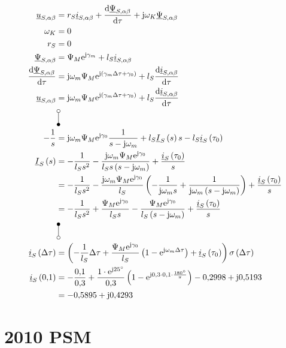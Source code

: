 \documentclass[11pt,a4paper]{scrartcl}
\newcommand{\mybr}[1]{\left(#1\right)}
\renewcommand{\j}{\mathrm{j}}
\renewcommand{\u}{\underline{u}}
\newcommand{\I}{\underline{I}}
\renewcommand{\i}{\underline{i}}
\newcommand{\PPsi}{\underline{\Psi}}
\newcommand{\0}{_{\mybr{0}}}
\newcommand{\1}{_{\mybr{1}}}
\newcommand{\2}{_{\mybr{2}}}
\renewcommand{\e}{\mathrm{e}}
\renewcommand{\d}{\mathrm{d}}
\newcommand{\isab}{\i_{S,\alpha\beta}}
\newcommand{\usab}{\u_{S,\alpha\beta}}
\newcommand{\psab}{\PPsi_{S,\alpha\beta}}
\begin{document}
\subsection{}
\begin{align}
\usab&=r_S\isab+\frac{\d\psab}{\d\tau}+\j\omega_K\psab\\
\omega_K&=0\\
r_S&=0\\
\psab&=\Psi_M\e^{\j\gamma_m}+l_S\isab\\
\frac{\d\psab}{\d\tau}&=\j\omega_m\Psi_M\e^{\j\mybr{\gamma_m\Delta\tau+\gamma_0}}+l_S\frac{\d\isab}{\d\tau}\\
\usab&=\j\omega_m\Psi_M\e^{\j\mybr{\gamma_m\Delta\tau+\gamma_0}}+l_S\frac{\d\isab}{\d\tau}\\
&\rotatebox[origin=c]{270}{\laplace}\nonumber\\
-\frac{1}{s}&=\j\omega_m\Psi_M\e^{\j\gamma_0}\frac{1}{s-\j\omega_m}+l_S\I_S\mybr{s}s-l_S\i_S\mybr{\tau_0}\\
\I_S\mybr{s}&=-\frac{1}{l_S s^2}-\frac{\j\omega_m\Psi_M\e^{\j\gamma_0}}{l_S s\mybr{s-\j\omega_m}}+\frac{\i_S\mybr{\tau_0}}{s}\\
&=-\frac{1}{l_S s^2}-\frac{\j\omega_m\Psi_M\e^{\j\gamma_0}}{l_S}\mybr{-\frac{1}{\j\omega_m s}+\frac{1}{\j\omega_m\mybr{s-\j\omega_m}}}+\frac{\i_S\mybr{\tau_0}}{s}\\
&=-\frac{1}{l_S s^2}+\frac{\Psi_M\e^{\j\gamma_0}}{l_S s}-\frac{\Psi_M\e^{\j\gamma_0}}{l_S\mybr{s-\j\omega_m}}+\frac{\i_S\mybr{\tau_0}}{s}\\
&\rotatebox[origin=c]{270}{\Laplace}\nonumber\\
\i_S\mybr{\Delta\tau}&=\mybr{-\frac{1}{l_S}\Delta\tau+\frac{\Psi_M\e^{\j\gamma_0}}{l_S}\mybr{1-\e^{\j\omega_m\Delta\tau}}+\i_S\mybr{\tau_0}}\sigma\mybr{\Delta\tau}\\
\i_S\mybr{\num{0.1}}&=-\frac{\num{0.1}}{\num{0.3}}+\frac{1\cdot\e^{\j\SI{25}{\degree}}}{\num{0.3}}\mybr{1-\e^{\j\num{0.3}\cdot\num{0.1}\cdot\frac{\SI{180}{\degree}}{\pi}}}-\num{0.2998}+\j\num{0.5193}\\
&=\num{-0.5895}+\j\num{0.4293}
\end{align}

\clearpage
\part{2010 PSM}
\end{document}
